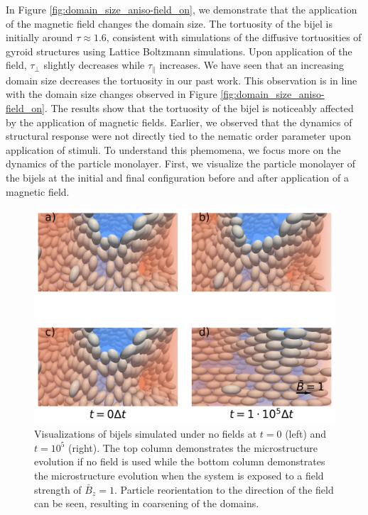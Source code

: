 In Figure \ref{fig:domain_size_aniso-field_on}, we demonstrate that the application of the magnetic field changes the 
domain size. The tortuosity of the bijel is initially around $\tau \approx 1.6$, consistent with simulations of the 
diffusive tortuosities of gyroid structures using Lattice Boltzmann simulations. \cite{luo_macroscopic_2020} 
Upon application of the field, $\tau_{\perp}$ slightly decreases while $\tau_{\parallel}$ increases. We have seen 
that an increasing domain size decreases the tortuosity in our past work. \cite{karthikeyan_formation_2024} This 
observation is in line with the domain size changes observed in Figure \ref{fig:domain_size_aniso-field_on}. The 
results show that the tortuosity of the bijel is noticeably affected by the application of magnetic fields. 
Earlier, we observed that the dynamics of structural response were not directly tied to the nematic order 
parameter upon application of stimuli. To understand this phemomena, we focus more on the dynamics of the 
particle monolayer. First, we visualize the particle monolayer of the bijels at the initial and final configuration 
before and after application of a magnetic field.

\begin{figure} 
    \centering 
    \includegraphics[scale=0.7]{../figures/results/paper2/particle_viz-field_on.png} 
    \caption{Visualizations of bijels simulated under no fields at $t = 0$ (left) and $t = 10^5$ (right). 
            The top column demonstrates the microstructure evolution if no field is used while the bottom column 
            demonstrates the microstructure evolution when the system is exposed to a field strength of $\bar{B}_z = 1$. 
            Particle reorientation to the direction of the field can be seen, resulting in coarsening of the domains.} 
    \label{fig:particle_viz-field_on} 
\end{figure}


